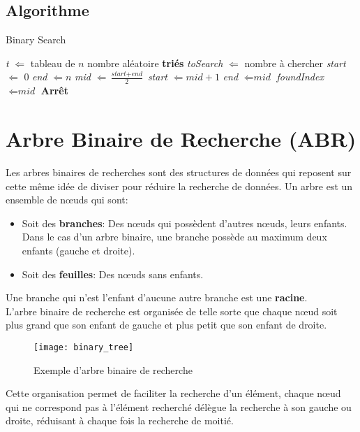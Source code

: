 \documentclass[11pt]{extarticle}
\begin{document}
\subsection{Algorithme}
\begin{algorithm}[h!]
\caption{Binary Search}\label{binary_search}
\begin{algorithmic} %
    \State \textit{t} $\Leftarrow $ tableau de $n$ nombre aléatoire \textbf{triés}
    \State \textit{toSearch} $\Leftarrow $ nombre à chercher
    \State \textit{start} $\Leftarrow $ 0
    \State \textit{end} $\Leftarrow n$
    	\State \textit{mid} $\Leftarrow \frac{\textit{start} + \textit{end}}{2}$
			\State \textit{start} $\Leftarrow \textit{mid} + 1$
			\State \textit{end} $\Leftarrow \textit{mid}$
		\Else
			\State \textit{foundIndex} $\Leftarrow \textit{mid}$
			\State \textbf{Arrêt}
		\EndIf
	\EndWhile
\end{algorithmic}
\end{algorithm}
\newpage
\section{Arbre Binaire de Recherche (ABR)}
Les arbres binaires de recherches sont des structures de données qui reposent sur cette même idée de diviser pour réduire la recherche de données. Un arbre est un ensemble de nœuds qui sont:
\begin{itemize}
\item Soit des \textbf{branches}: Des nœuds qui possèdent d'autres nœuds, leurs enfants. Dans le cas d'un arbre binaire, une branche possède au maximum deux enfants (gauche et droite).
\item Soit des \textbf{feuilles}: Des nœuds sans enfants.
\end{itemize}
Une branche qui n'est l'enfant d'aucune autre branche est une \textbf{racine}.\\
L'arbre binaire de recherche est organisée de telle sorte que chaque nœud soit plus grand que son enfant de gauche et plus petit que son enfant de droite.
\begin{figure}[h!]
\begin{center}
\texttt{[image: binary\_tree]}
\caption{Exemple d'arbre binaire de recherche}
\end{center}
\end{figure}
Cette organisation permet de faciliter la recherche d'un élément, chaque nœud qui ne correspond pas à l'élément recherché délègue la recherche à son gauche ou droite, réduisant à chaque fois la recherche de moitié.
\end{document}
